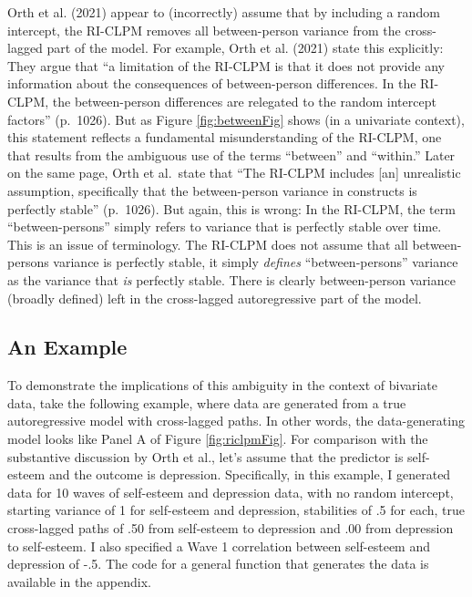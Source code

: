 \documentclass[
  english,
  man,floatsintext]{apa6}
\begin{document}
Orth et al. (2021) appear to (incorrectly) assume that by including a random intercept, the RI-CLPM removes all between-person variance from the cross-lagged part of the model. For example, Orth et al. (2021) state this explicitly: They argue that ``a limitation of the RI-CLPM is that it does not provide any information about the consequences of between-person differences. In the RI-CLPM, the between-person differences are relegated to the random intercept factors'' (p.~1026). But as Figure \ref{fig:betweenFig} shows (in a univariate context), this statement reflects a fundamental misunderstanding of the RI-CLPM, one that results from the ambiguous use of the terms ``between'' and ``within.'' Later on the same page, Orth et al.~state that ``The RI-CLPM includes {[}an{]} unrealistic assumption, specifically that the between-person variance in constructs is perfectly stable'' (p.~1026). But again, this is wrong: In the RI-CLPM, the term ``between-persons'' simply refers to variance that is perfectly stable over time. This is an issue of terminology. The RI-CLPM does not assume that all between-persons variance is perfectly stable, it simply \emph{defines} ``between-persons'' variance as the variance that \emph{is} perfectly stable. There is clearly between-person variance (broadly defined) left in the cross-lagged autoregressive part of the model.

\hypertarget{an-example}{%
\subsection{An Example}\label{an-example}}

To demonstrate the implications of this ambiguity in the context of bivariate data, take the following example, where data are generated from a true autoregressive model with cross-lagged paths. In other words, the data-generating model looks like Panel A of Figure \ref{fig:riclpmFig}. For comparison with the substantive discussion by Orth et al., let's assume that the predictor is self-esteem and the outcome is depression. Specifically, in this example, I generated data for 10 waves of self-esteem and depression data, with no random intercept, starting variance of 1 for self-esteem and depression, stabilities of .5 for each, true cross-lagged paths of .50 from self-esteem to depression and .00 from depression to self-esteem. I also specified a Wave 1 correlation between self-esteem and depression of -.5. The code for a general function that generates the data is available in the appendix.
\end{document}
